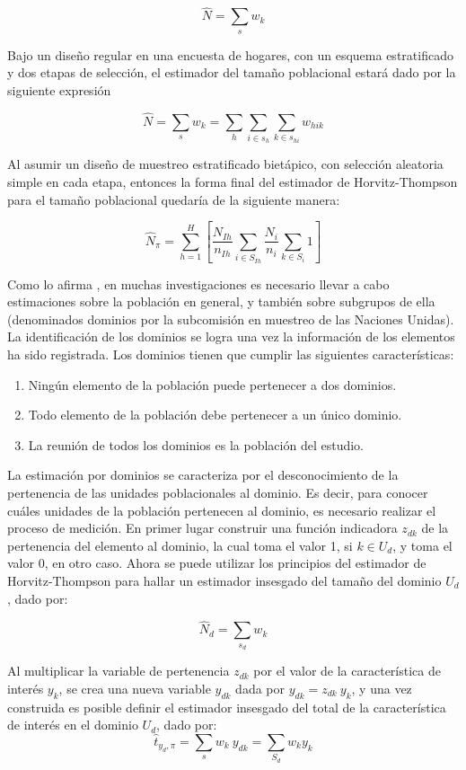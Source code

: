 \documentclass[
  10pt,
  spanish,
]{book}
\providecommand{\tightlist}{%
  \setlength{\itemsep}{0pt}\setlength{\parskip}{0pt}}
\begin{document}
\[
\hat{N} = \sum_s w_k 
\]

Bajo un diseño regular en una encuesta de hogares, con un esquema estratificado y dos etapas de selección, el estimador del tamaño poblacional estará dado por la siguiente expresión

\[
\hat{N} = \sum_s w_k = \sum_h \sum_{i \in s_h} \sum_{k \in s_{hi}}  w_{hik} 
\]

Al asumir un diseño de muestreo estratificado bietápico, con selección aleatoria simple en cada etapa, entonces la forma final del estimador de Horvitz-Thompson para el tamaño poblacional quedaría de la siguiente manera:

\[
\hat{N}_{\pi}=\sum_{h=1}^H\left[\frac{N_{Ih}}{n_{Ih}}\sum_{i\in S_{Ih}}\frac{N_i}{n_i}\sum_{k\in S_i}1\right]
\]

Como lo afirma \citet{Gutierrez_2016}, en muchas investigaciones es necesario llevar a cabo estimaciones sobre la población en general, y también sobre subgrupos de ella (denominados dominios por la subcomisión en muestreo de las Naciones Unidas). La identificación de los dominios se logra una vez la información de los elementos ha sido registrada. Los dominios tienen que cumplir las siguientes características:

\begin{enumerate}
\def\labelenumi{\arabic{enumi}.}
\tightlist
\item
  Ningún elemento de la población puede pertenecer a dos dominios.
\item
  Todo elemento de la población debe pertenecer a un único dominio.
\item
  La reunión de todos los dominios es la población del estudio.
\end{enumerate}

La estimación por dominios se caracteriza por el desconocimiento de la pertenencia de las unidades poblacionales al dominio. Es decir, para conocer cuáles unidades de la población pertenecen al dominio, es necesario realizar el proceso de medición. En primer lugar construir una función indicadora \(z_{dk}\) de la pertenencia del elemento al dominio, la cual toma el valor 1, si \(k\in U_d\), y toma el valor 0, en otro caso. Ahora se puede utilizar los principios del estimador de Horvitz-Thompson para hallar un estimador insesgado del tamaño del dominio \(U_d\), dado por:

\[
\hat{N}_d = \sum_{s_d} w_k 
\]

Al multiplicar la variable de pertenencia \(z_{dk}\) por el valor de la característica de interés \(y_k\), se crea una nueva variable \(y_{dk}\) dada por \(y_{dk}=z_{dk} \ y_k\), y una vez construida es posible definir el estimador insesgado del total de la característica de interés en el dominio \(U_d\), dado por:
\[
\hat{t}_{y_d,\pi}=\sum_sw_k\ y_{dk}=\sum_{S_d}w_ky_k
\]
\end{document}
